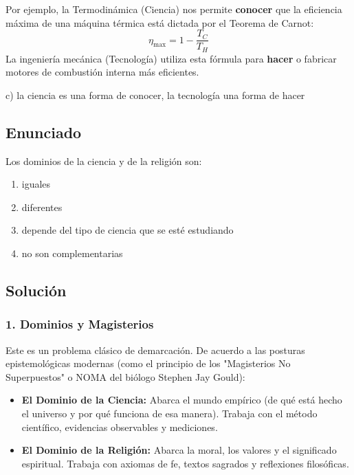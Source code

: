 \documentclass[12pt, a4paper]{article}
\begin{document}
Por ejemplo, la Termodinámica (Ciencia) nos permite \textbf{conocer} que la eficiencia máxima de una máquina térmica está dictada por el Teorema de Carnot:
$$ \eta_{\text{max}} = 1 - \frac{T_C}{T_H} $$
La ingeniería mecánica (Tecnología) utiliza esta fórmula para \textbf{hacer} o fabricar motores de combustión interna más eficientes.

\begin{tcolorbox}[colback=green!5!white, colframe=green!50!black, title=Respuesta Final]
\centering \Large c) la ciencia es una forma de conocer, la tecnología una forma de hacer
\end{tcolorbox}

\newpage


\subsection*{Enunciado}
Los dominios de la ciencia y de la religión son:
\begin{enumerate}[label=\alph*)]
    \item iguales
    \item diferentes
    \item depende del tipo de ciencia que se esté estudiando
    \item no son complementarias
\end{enumerate}

\subsection*{Solución}

\subsubsection*{1. Dominios y Magisterios}
Este es un problema clásico de demarcación. De acuerdo a las posturas epistemológicas modernas (como el principio de los "Magisterios No Superpuestos" o NOMA del biólogo Stephen Jay Gould):

\begin{itemize}
    \item \textbf{El Dominio de la Ciencia:} Abarca el mundo empírico (de qué está hecho el universo y por qué funciona de esa manera). Trabaja con el método científico, evidencias observables y mediciones.
    \item \textbf{El Dominio de la Religión:} Abarca la moral, los valores y el significado espiritual. Trabaja con axiomas de fe, textos sagrados y reflexiones filosóficas.
\end{itemize}
\end{document}
